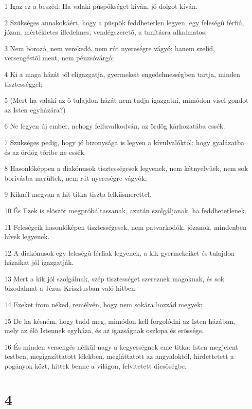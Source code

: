 \par 1 Igaz ez a beszéd: Ha valaki püspökséget kiván, jó dolgot kíván.
\par 2 Szükséges annakokáért, hogy a püspök feddhetetlen legyen, egy feleségû férfiú, józan, mértékletes illedelmes, vendégszeretõ, a  tanításra alkalmatos;
\par 3 Nem borozó, nem verekedõ, nem rút nyereségre vágyó; hanem szelíd, versengéstõl ment, nem pénzsóvárgó;
\par 4 Ki a maga házát jól eligazgatja, gyermekeit engedelmességben tartja, minden tisztességgel;
\par 5 (Mert ha valaki az õ tulajdon házát nem tudja igazgatni, mimódon visel gondot az Isten egyházára?)
\par 6 Ne legyen új ember, nehogy felfuvalkodván, az ördög kárhozatába essék.
\par 7 Szükséges pedig, hogy jó bizonysága is legyen a kívülvalóktól; hogy gyalázatba és az ördög tõribe ne essék.
\par 8 Hasonlóképpen a diakónusok tisztességesek legyenek, nem kétnyelvûek, nem sok borivásba merültek, nem rút nyereségre vágyók;
\par 9 Kiknél megvan a hit titka tiszta lelkiismerettel.
\par 10 És Ezek is elõször megpróbáltassanak, azután szolgáljanak, ha feddhetetlenek.
\par 11 Feleségeik hasonlóképen tisztességesek, nem patvarkodók, józanok, mindenben hívek legyenek.
\par 12 A diakónusok egy feleségû férfiak legyenek, a kik gyermekeiket és tulajdon házaikat jól igazgatják.
\par 13 Mert a kik jól szolgálnak, szép tisztességet szereznek magoknak, és sok bizodalmat a Jézus Krisztusban való hitben.
\par 14 Ezeket írom néked, remélvén, hogy nem sokára hozzád megyek;
\par 15 De ha késném, hogy tudd meg, mimódon kell forgolódni az Isten házában, mely az élõ Istennek egyháza, és az igazságnak oszlopa és erõssége.
\par 16 És minden versengés nélkül nagy a kegyességnek eme titka: Isten megjelent testben, megigazíttatott lélekben, megláttatott az angyaloktól, hirdettetett a pogányok közt, hittek benne a világon, felvitetett dicsõségbe.

\chapter{4}

